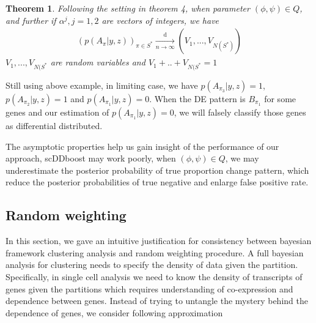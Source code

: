 \documentclass[aoas,preprint]{imsart}
\newtheorem{theorem}{Theorem}
\begin{document}
\begin{theorem} Following the setting in theorem 4, when parameter $(\phi, \psi)\in Q$,  and further if $\alpha^j, j = 1,2$ are vectors of integers, we have 
\begin{eqnarray*}
    (p(A_{\pi} | y, z))_{\pi\in S^*} \xrightarrow[n\rightarrow\infty]{\text{d}}%
                (V_1, ..., V_{N(S^*)})
\end{eqnarray*}
$V_1, ..., V_{N(S^*}$ are random variables and $V_1 + .. + V_{N(S^*} = 1$
\end{theorem} 

Still using above example, in limiting case, we have $p(A_{\pi_3} | y,z) = 1$, $p(A_{\pi_2} | y,z) = 1$ and $p(A_{\pi_1}| y,z) = 0$. When the DE pattern is $B_{\pi_1}$ for some genes and our estimation of $p(A_{\pi_1}| y,z) = 0$, we will falsely classify those genes as differential distributed.

The asymptotic properties help us gain insight of the performance of our approach,
scDDboost may work poorly, when $(\phi, \psi)\in Q$, we may underestimate the posterior probability of true proportion change pattern, which reduce the posterior probabilities of true negative and enlarge false positive rate.\\

\subsection{Random weighting}
In this section, we gave an intuitive justification for consistency between bayesian framework clustering analysis and random weighting procedure. A full bayesian analysis for clustering needs to specify the density of data given the partition. Specifically, in single cell analysis we need to know the density of transcripts of genes given the partitions which requires understanding of co-expression and dependence between genes. Instead of trying to untangle the mystery behind the dependence of genes, we consider following approximation 
\end{document}
